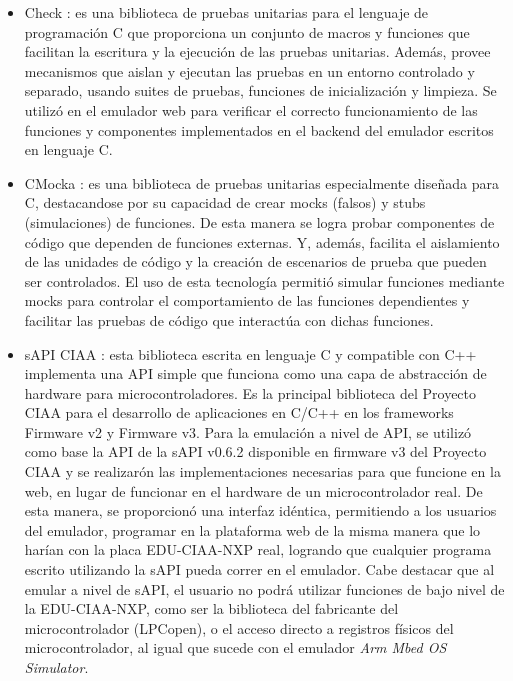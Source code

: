 \begin{itemize}
    \item Check \citep{Check}: es una biblioteca de pruebas unitarias para el lenguaje de programación C que proporciona un conjunto de macros y funciones que facilitan la escritura y la ejecución de las pruebas unitarias. Además, provee mecanismos que aislan y ejecutan las pruebas en un entorno controlado y separado, usando suites de pruebas, funciones de inicialización y limpieza. Se utilizó en el emulador web para verificar el correcto funcionamiento de las funciones y componentes implementados en el backend del emulador escritos en lenguaje C.
    
    \item CMocka \citep{CMocka}: es una biblioteca de pruebas unitarias especialmente diseñada para C, destacandose por su capacidad de crear mocks (falsos) y stubs (simulaciones) de funciones. De esta manera se logra probar componentes de código que dependen de funciones externas. Y, además, facilita el aislamiento de las unidades de código y la creación de escenarios de prueba que pueden ser controlados. El uso de esta tecnología permitió simular funciones mediante mocks para controlar el comportamiento de las funciones dependientes y facilitar las pruebas de código que interactúa con dichas funciones.
    
    \item sAPI CIAA \citep{sAPICIAA}: esta biblioteca escrita en lenguaje C y compatible con C++ implementa una API simple que funciona como una capa de abstracción de hardware para microcontroladores. Es la principal biblioteca del Proyecto CIAA para el desarrollo de aplicaciones en C/C++ en los frameworks Firmware v2\citep{firmwareV2} y Firmware v3\citep{firmwareV3}. 
Para la emulación a nivel de API, se utilizó como base la API de la sAPI v0.6.2 disponible en firmware v3 del Proyecto CIAA \citep{sAPIv0.6.2} y se realizarón las implementaciones necesarias para que funcione en la web, en lugar de funcionar en el hardware de un microcontrolador real.
De esta manera, se proporcionó una interfaz idéntica, permitiendo a los usuarios del emulador, programar en la plataforma web de la misma manera que lo harían con la placa EDU-CIAA-NXP real, logrando que cualquier programa escrito utilizando la sAPI pueda correr en el emulador.
Cabe destacar que al emular a nivel de sAPI, el usuario no podrá utilizar funciones de bajo nivel de la EDU-CIAA-NXP, como ser la biblioteca del fabricante del microcontrolador (LPCopen\citep{lpcopen}), o el acceso directo a registros físicos del microcontrolador, al igual que sucede con el emulador \textit{Arm Mbed OS Simulator}.
\end{itemize}


